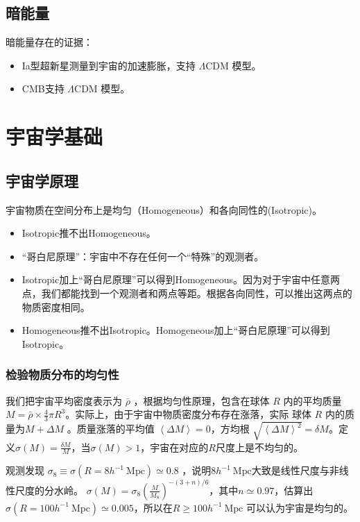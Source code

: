 \documentclass[]{ctexart}
\begin{document}
\subsection{暗能量}

暗能量存在的证据：
\begin{itemize}
	\item Ia型超新星测量到宇宙的加速膨胀，支持 $\Lambda$CDM 模型。
    \item CMB支持 $\Lambda$CDM 模型。
\end{itemize}

\section{宇宙学基础}

\subsection{宇宙学原理}

宇宙物质在空间分布上是均匀（Homogeneous）和各向同性的(Isotropic)。

\begin{itemize}
	\item Isotropic推不出Homogeneous。
    \item “哥白尼原理”：宇宙中不存在任何一个“特殊”的观测者。
    \item Isotropic加上“哥白尼原理”可以得到Homogeneous。因为对于宇宙中任意两点，我们都能找到一个观测者和两点等距。根据各向同性，可以推出这两点的物质密度相同。
    \item Homogeneous推不出Isotropic。Homogeneous加上“哥白尼原理”可以得到Isotropic。
\end{itemize}

\subsubsection{检验物质分布的均匀性}

我们把宇宙平均密度表示为 $\bar{\rho}$ ，根据均匀性原理，包含在球体 $R$ 内的平均质量 $M=\bar{\rho}\times\frac{4}{3} \pi R^3$。实际上，由于宇宙中物质密度分布存在涨落，实际 球体 $R$ 内的质量为$M+\Delta M$ 。质量涨落的平均值 $\left\langle \Delta M \right\rangle = 0$，方均根 $\sqrt{ \left\langle \Delta M \right\rangle ^2 } = \delta M$。定义$\sigma (M) = \frac{\delta M}{M}$，当$\sigma (M) > 1$，宇宙在对应的$R$尺度上是不均匀的。

观测发现 $\sigma_8 \equiv \sigma(R=8 h^{-1} \mathrm{~Mpc} ) \simeq 0.8$ ，说明$8 h^{-1} \mathrm{~Mpc}$大致是线性尺度与非线性尺度的分水岭。 $\sigma(M)=\sigma_{8}\left(\frac{M}{M_{8}}\right)^{-(3+n) / 6}$，其中$n\simeq 0.97$，估算出$\sigma(R=100 h^{-1} \mathrm{~Mpc} ) \simeq 0.005$，所以在$R \ge 100 h^{-1}\mathrm{~Mpc}$ 可以认为宇宙是均匀的。
\end{document}
